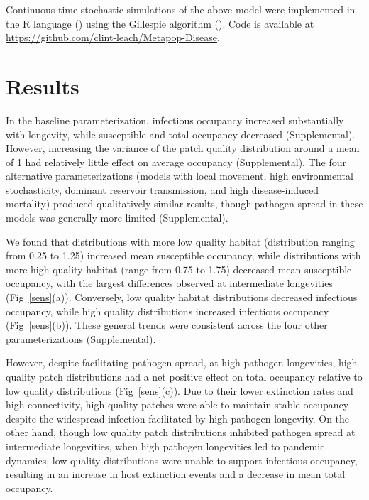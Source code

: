 \documentclass{article}
\begin{document}
Continuous time stochastic simulations of the above model were implemented in the R language (\cite{R2014}) using the Gillespie algorithm (\cite{Gillespie1977}).  Code is available at \url{https://github.com/clint-leach/Metapop-Disease}.

\section{Results}
\label{results}

In the baseline parameterization, infectious occupancy increased substantially with longevity, while susceptible and total occupancy decreased (Supplemental).  However, increasing the variance of the patch quality distribution around a mean of 1 had relatively little effect on average occupancy (Supplemental).  The four alternative parameterizations (models with local movement, high environmental stochasticity, dominant reservoir transmission, and high disease-induced mortality) produced qualitatively similar results, though pathogen spread in these models was generally more limited (Supplemental).

We found that distributions with more low quality habitat (distribution ranging from 0.25 to 1.25) increased mean susceptible occupancy, while distributions with more high quality habitat (range from 0.75 to 1.75) decreased mean susceptible occupancy, with the largest differences observed at intermediate longevities (Fig~\ref{sens}(a)).  Conversely, low quality habitat distributions decreased infectious occupancy, while high quality distributions increased infectious occupancy (Fig~\ref{sens}(b)).  These general trends were consistent across the four other parameterizations (Supplemental).  

However, despite facilitating pathogen spread, at high pathogen longevities, high quality patch distributions had a net positive effect on total occupancy relative to low quality distributions (Fig~\ref{sens}(c)).  Due to their lower extinction rates and high connectivity, high quality patches were able to maintain stable occupancy despite the widespread infection facilitated by high pathogen longevity.  On the other hand, though low quality patch distributions inhibited pathogen spread at intermediate longevities, when high pathogen longevities led to pandemic dynamics, low quality distributions were unable to support infectious occupancy, resulting in an increase in host extinction events and a decrease in mean total occupancy.  
\end{document}
